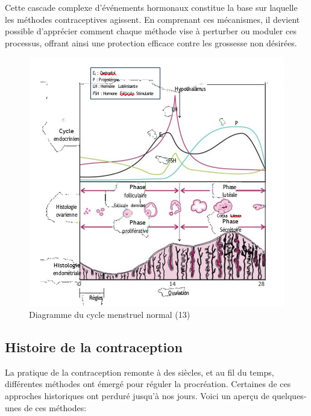 \vspace{1em}

\noindent Cette cascade complexe d'événements hormonaux constitue la base sur laquelle les méthodes contraceptives agissent. En comprenant ces mécanismes, il devient possible d'apprécier comment chaque méthode vise à perturber ou moduler ces processus, offrant ainsi une protection efficace contre les grossesse non désirées.

\begin{figure}[H]
  \centering
  \includegraphics[scale=1.5]{Images/fig_8.jpg.png}
  \caption{Diagramme du cycle menstruel normal (13)}
\end{figure}

\subsection{Histoire de la contraception}
La pratique de la contraception remonte à des siècles, et au fil du temps, différentes méthodes ont émergé pour réguler la procréation. Certaines de ces approches historiques ont perduré jusqu'à nos jours. Voici un aperçu de quelques-unes de ces méthodes:\vspace*{1em}


